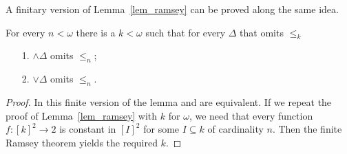 \documentclass[creche.tex]{subfiles}
\begin{document}
A finitary version of Lemma~\ref{lem_ramsey} can be proved along the same idea.


\begin{proposition}\label{lem_ramsey2} For every $n<\omega$ there is a $k<\omega$ such that for every $\Delta$ that omits $\le_k$
\begin{itemize}
\item[1.] $\wedge\Delta$ omits $\le_n$;
\item[2.] $\vee\Delta$ omits $\le_n$.
\end{itemize}
\end{proposition}
\begin{proof}
In this finite version of the lemma  and  are equivalent. If we repeat the proof of Lemma~\ref{lem_ramsey} with $k$ for $\omega$, we need that every function $f:[k]^2\to2$ is constant in $[I]^2$ for some $I\subseteq k$ of cardinality $n$. Then the finite Ramsey theorem yields the required $k$.
\end{proof}




% 
% 
% 
% 
% 
% 
% 
% 
% 
% 
% 
% 
% 
\end{document}
